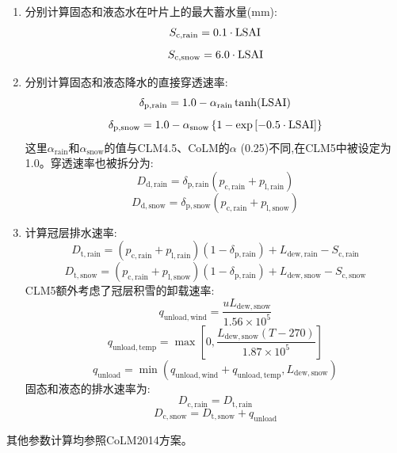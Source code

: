 \begin{enumerate}
  \item 分别计算固态和液态水在叶片上的最大蓄水量(mm):
    \begin{equation}
      S_{\mathrm{c,rain}}=0.1\cdot{\rm LSAI}
    \end{equation}
    \begin{equation}
      S_{\mathrm{c,snow}}=6.0\cdot{\rm LSAI}
    \end{equation}
  \item 分别计算固态和液态降水的直接穿透速率:
    \begin{equation}
      \delta_{\mathrm{p,rain}}=1.0 - \alpha_{\mathrm{rain}} \tanh({\rm LSAI})
    \end{equation}
    \begin{equation}
      \delta_{\mathrm{p,snow}}=1.0 - \alpha_{\mathrm{snow}}\left\{1-\exp\left[-0.5\cdot{\rm LSAI}\right]\right\}
    \end{equation}
    这里$\alpha_{\mathrm{rain}}$和$\alpha_{\mathrm{snow}}$的值与CLM4.5、CoLM的$\alpha$ (0.25)不同,在CLM5中被设定为1.0。穿透速率也被拆分为:
    \begin{equation}
      D_{\mathrm{d,rain}}=\delta_{\mathrm{p,rain}}(p_{\mathrm {c,rain}} +p_{\mathrm{l,rain}})
    \end{equation}
    \begin{equation}
      D_{\mathrm{d,snow}}=\delta_{\mathrm{p,snow}}(p_{\mathrm {c,rain}} +p_{\mathrm{l,snow}})
    \end{equation}
  \item 计算冠层排水速率:
    \begin{equation}
      D_{\mathrm {t,rain}}=(p_{\mathrm {c,rain}} +p_{\mathrm{l,rain}})(1-\delta_{\mathrm{p,rain}})+L_{\mathrm{dew,rain}}-S_{\mathrm{c,rain}}
    \end{equation}
    \begin{equation}
      D_{\mathrm {t,snow}}=(p_{\mathrm {c,rain}} +p_{\mathrm{l,snow}})(1-\delta_{\mathrm{p,rain}})+L_{\mathrm{dew,snow}}-S_{\mathrm{c,snow}}
    \end{equation}
    CLM5额外考虑了冠层积雪的卸载速率:
    \begin{equation}\label{q_unl_wind}
      q_{\mathrm{unload,wind}}=\frac{uL_{\mathrm{dew,snow}}}{1.56\times 10^5}
    \end{equation}
    \begin{equation}
      q_{\mathrm{unload,temp}}=\max\left[0, \frac{L_{\mathrm{dew,snow}}(T-270)}{1.87\times 10^5}\right]
    \end{equation}
    \begin{equation}\label{q_unl_tot}
      q_{\mathrm{unload}}=\min(q_{\mathrm{unload,wind}}+q_{\mathrm{unload,temp}},L_{\mathrm{dew,snow}})
    \end{equation}
    固态和液态的排水速率为:
    \begin{equation}
      D_{\mathrm{c,rain}}=D_{\mathrm {t,rain}}
    \end{equation}
    \begin{equation}
      D_{\mathrm{c,snow}}=D_{\mathrm {t,snow}}+q_{\mathrm{unload}}
    \end{equation}
\end{enumerate}
其他参数计算均参照CoLM2014方案。


